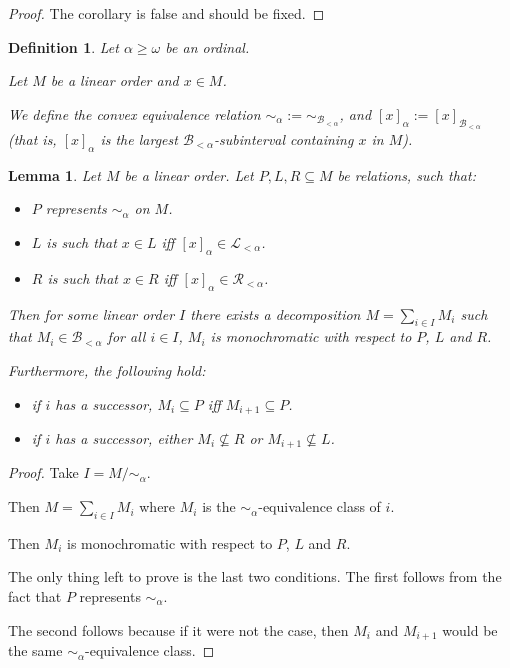 \documentclass{article}
\newtheorem{lemma}{Lemma}
\newtheorem{definition}{Definition}
\newcommand{\brackets}[1]{\left[ {#1} \right]}
\begin{document}
\begin{proof}
  The corollary is false and should be fixed.
\end{proof}

\begin{definition}
  Let $\alpha \ge \omega$ be an ordinal.

  Let $M$ be a linear order and $x \in M$.

  We define the convex equivalence relation $\sim_\alpha := \sim_{\mathcal{B}_{< \alpha}}$,
  and $\brackets{x}_{\alpha} := \brackets{x}_{\mathcal{B}_{< \alpha}}$ (that is,
  $\brackets{x}_{\alpha}$ is the largest $\mathcal{B}_{< \alpha}$-subinterval
  containing $x$ in $M$).
\end{definition}

\begin{lemma}
  Let $M$ be a linear order. Let $P, L, R \subseteq M$ be relations, such that:

  \begin{itemize}
    \item $P$ represents $\sim_{\alpha}$ on $M$.
    \item $L$ is such that $x \in L$ iff $\brackets{x}_{\alpha} \in \mathcal{L}_{< \alpha}$.
    \item $R$ is such that $x \in R$ iff $\brackets{x}_{\alpha} \in \mathcal{R}_{< \alpha}$.
  \end{itemize}

  Then for some linear order $I$ there exists a decomposition
  $M = \sum_{i \in I} M_i$ such that $M_i \in \mathcal{B}_{< \alpha}$ for all $i \in I$,
  $M_i$ is monochromatic with respect to $P$, $L$ and $R$.

  Furthermore, the following hold:
  \begin{itemize}
    \item if $i$ has a successor, $M_i \subseteq P$ iff $M_{i+1} \subseteq P$.
    \item if $i$ has a successor, either $M_i \not \subseteq R$ or $M_{i+1} \not \subseteq L$.
  \end{itemize}
\end{lemma}
\begin{proof}
  Take $I = M / \sim_{\alpha}$.

  Then $M = \sum_{i \in I} M_i$ where $M_i$ is the $\sim_{\alpha}$-equivalence class of $i$.

  Then $M_i$ is monochromatic with respect to $P$, $L$ and $R$.

  The only thing left to prove is the last two conditions. The first follows from
  the fact that $P$ represents $\sim_{\alpha}$.

  The second follows because if it were not the case, then $M_i$ and $M_{i+1}$ would
  be the same $\sim_{\alpha}$-equivalence class.
\end{proof}
\end{document}
